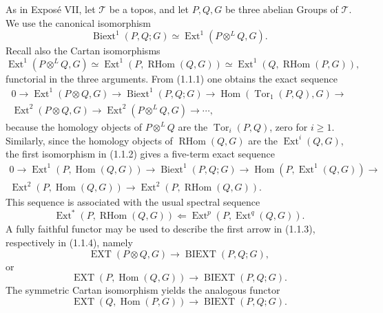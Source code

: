 \documentclass[11pt]{article}
\providecommand{\Hom}{\operatorname{Hom}}
\providecommand{\Ext}{\operatorname{Ext}}
\providecommand{\Biext}{\operatorname{Biext}}
\providecommand{\Ext}{\operatorname{Ext}}
\providecommand{\Torop}{\operatorname{Tor}}
\providecommand{\RHom}{\operatorname{RHom}}
\providecommand{\cT}{\mathcal T}
\begin{document}
As in Exposé VII, let \(\cT\) be a topos, and let \(P,Q,G\) be three abelian Groups of \(\cT\).  We use the canonical isomorphism
\begin{equation}\tag{1.1.1}
        \Biext^1(P,Q;G)\simeq \Ext^1(P\otimes^L Q,G).
\end{equation}
Recall also the Cartan isomorphisms
\begin{equation}\tag{1.1.2}
 \Ext^1(P\otimes^L Q,G)
 \simeq \Ext^1(P,\RHom(Q,G))
 \simeq \Ext^1(Q,\RHom(P,G)),
\end{equation}
functorial in the three arguments.  From (1.1.1) one obtains the exact sequence
\begin{equation}\tag{1.1.3}
\begin{gathered}
0\to \Ext^1(P\otimes Q,G)\to \Biext^1(P,Q;G)
\to \Hom(\Torop_1(P,Q),G)\to{}\\
\Ext^2(P\otimes Q,G)\to \Ext^2(P\otimes^L Q,G)\to\cdots,
\end{gathered}
\end{equation}
because the homology objects of \(P\otimes^L Q\) are the \(\Torop_i(P,Q)\), zero for \(i\ge1\).  Similarly, since the homology objects of \(\RHom(Q,G)\) are the \(\Ext^i(Q,G)\), the first isomorphism in (1.1.2) gives a five-term exact sequence
\begin{equation}\tag{1.1.4}
\begin{gathered}
0\to \Ext^1(P,\Hom(Q,G))\to \Biext^1(P,Q;G)
\to \Hom(P,\Ext^1(Q,G))\to{}\\
\Ext^2(P,\Hom(Q,G))\to \Ext^2(P,\RHom(Q,G)).
\end{gathered}
\end{equation}
This sequence is associated with the usual spectral sequence
\[
        \Ext^*(P,\RHom(Q,G))\Longleftarrow
        \Ext^p(P,\Ext^q(Q,G)).
\]
A fully faithful functor may be used to describe the first arrow in (1.1.3), respectively in (1.1.4), namely
\begin{equation}\tag{1.1.5}
        \operatorname{EXT}(P\otimes Q,G)\to\operatorname{BIEXT}(P,Q;G),
\end{equation}
or
\begin{equation}\tag{1.1.6}
        \operatorname{EXT}(P,\Hom(Q,G))\to\operatorname{BIEXT}(P,Q;G).
\end{equation}
The symmetric Cartan isomorphism yields the analogous functor
\begin{equation}\tag{1.1.7}
        \operatorname{EXT}(Q,\Hom(P,G))\to\operatorname{BIEXT}(P,Q;G).
\end{equation}
\end{document}
